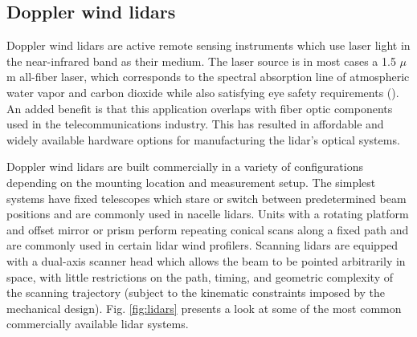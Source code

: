 

\clearpage
\subsection{Doppler wind lidars}
\label{sec:intro_lidar}

Doppler wind lidars are active remote sensing instruments which use laser light in the near-infrared band as their medium. The laser source is in most cases a 1.5 $\mu$\\m all-fiber laser, which corresponds to the spectral absorption line of atmospheric water vapor and carbon dioxide while also satisfying eye safety requirements (\cite{cariou_laser_2006}). An added benefit is that this application overlaps with fiber optic components used in the telecommunications industry. This has resulted in affordable and widely available hardware options for manufacturing the lidar's optical systems.

Doppler wind lidars are built commercially in a variety of configurations depending on the mounting location and measurement setup. The simplest systems have fixed telescopes which stare or switch between predetermined beam positions and are commonly used in nacelle lidars. Units with a rotating platform and offset mirror or prism perform repeating conical scans along a fixed path and are commonly used in certain lidar wind profilers. Scanning lidars are equipped with a dual-axis scanner head which allows the beam to be pointed arbitrarily in space, with little restrictions on the path, timing, and geometric complexity of the scanning trajectory (subject to the kinematic constraints imposed by the mechanical design). Fig. \ref{fig:lidars} presents a look at some of the most common commercially available lidar systems.

